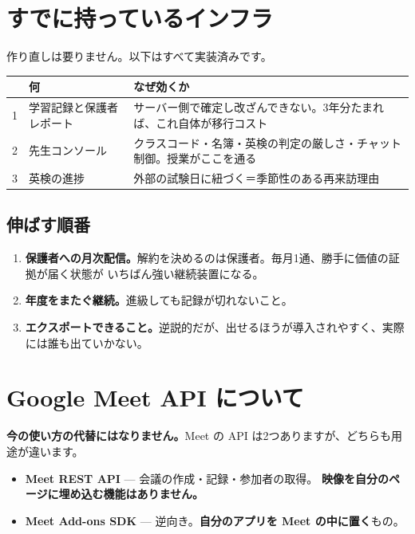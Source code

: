 \documentclass[a4paper,10.5pt]{article}
\begin{document}
\section{すでに持っているインフラ}

作り直しは要りません。以下はすべて実装済みです。

\begin{center}
\begin{tabular}{@{}p{}p{}p{}@{}}
\toprule
& \textbf{何} & \textbf{なぜ効くか} \\
\midrule
1 & 学習記録と保護者レポート
  & サーバー側で確定し改ざんできない。3年分たまれば、これ自体が移行コスト \\
2 & 先生コンソール
  & クラスコード・名簿・英検の判定の厳しさ・チャット制御。授業がここを通る \\
3 & 英検の進捗
  & 外部の試験日に紐づく＝季節性のある再来訪理由 \\
\bottomrule
\end{tabular}
\end{center}

\subsection{伸ばす順番}

\begin{enumerate}[leftmargin=16pt,itemsep=3pt,topsep=2pt]
  \item \textbf{保護者への月次配信。}解約を決めるのは保護者。毎月1通、勝手に価値の証拠が届く状態が
        いちばん強い継続装置になる。
  \item \textbf{年度をまたぐ継続。}進級しても記録が切れないこと。
  \item \textbf{エクスポートできること。}逆説的だが、出せるほうが導入されやすく、実際には誰も出ていかない。
\end{enumerate}

\section{Google Meet API について}

\begin{caution}
\textbf{今の使い方の代替にはなりません。}Meet の API は2つありますが、どちらも用途が違います。
\begin{itemize}[leftmargin=16pt,itemsep=2pt,topsep=3pt]
  \item \textbf{Meet REST API} — 会議の作成・記録・参加者の取得。
        \textbf{映像を自分のページに埋め込む機能はありません。}
  \item \textbf{Meet Add-ons SDK} — 逆向き。\textbf{自分のアプリを Meet の中に置く}もの。
\end{itemize}
\end{caution}
\end{document}
